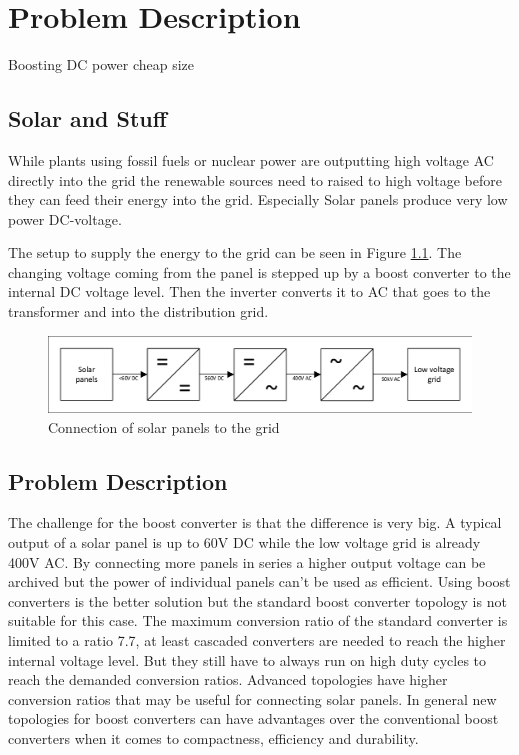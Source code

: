 \chapter{Problem Description}\label{ch:probdesc}
Boosting DC power
cheap
size

\section{Solar and Stuff}
While plants using fossil fuels or nuclear power are outputting high voltage AC directly into the grid the renewable sources need to raised to high voltage before they can feed their energy into the grid.
Especially Solar panels produce very low power DC-voltage. 

The setup to supply the energy to the grid can be seen in Figure \ref{fig:SolarConverters}.
The changing voltage coming from the panel is stepped up by a boost converter to the internal DC voltage level. 
Then the inverter converts it to AC that goes to the transformer and into the distribution grid.

\begin{figure}[H]
   \centering
   \includegraphics[width=\textwidth]{figures/Problem/SolarConverters.pdf}
    \caption{Connection of solar panels to the grid}
	\label{fig:SolarConverters}
\end{figure}

\section{Problem Description}
The challenge for the boost converter is that the difference is very big.
A typical output of a solar panel is up to 60V DC while the low voltage grid is already 400V AC.
By connecting more panels in series a higher output voltage can be archived but the power of individual panels can't be used as efficient.
Using boost converters is the better solution but the standard boost converter topology is not suitable for this case. 
The maximum conversion ratio of the standard converter is limited to a ratio 7.7, at least cascaded converters are needed to reach the higher internal voltage level.
But they still have to always run on high duty cycles to reach the demanded conversion ratios.
Advanced topologies have higher conversion ratios that may be useful for connecting solar panels.
In general new topologies for boost converters can have advantages over the conventional boost converters when it comes to compactness, efficiency and durability.